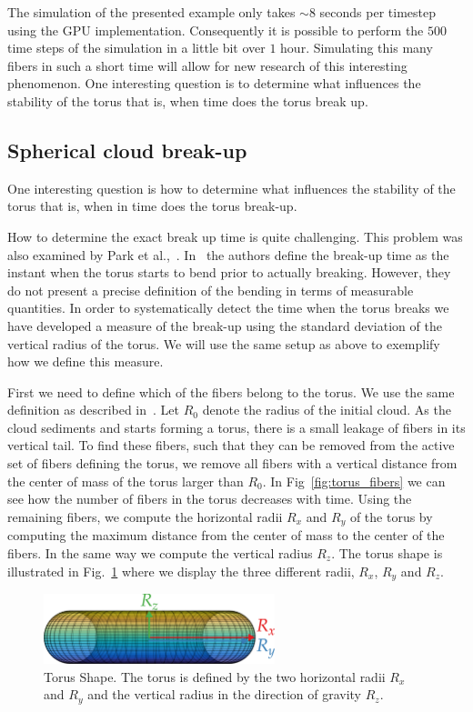 The simulation of the presented example only takes ${\sim}8$ seconds per timestep using the GPU implementation. Consequently it is possible to perform the $500$ time steps of the simulation in a little bit over $1$ hour. Simulating this many fibers in such a short time will allow for new research of this interesting phenomenon. One interesting question is to determine what influences the stability of the torus that is, when time does the torus break up.

\subsection{Spherical cloud break-up}
\label{subsec:sphere_break}

One interesting question is how to determine what influences the stability of the torus that is, when in time does the torus break-up.

How to determine the exact break up time is quite challenging. This problem was also examined by Park et al.,~\cite{Park2010}. In~\cite{Park2010} the authors define the break-up time as the instant when the torus starts to bend prior to actually breaking. However, they do not present a precise definition of the bending in terms of measurable quantities. In order to systematically detect the time when the torus breaks we have developed a measure of the break-up using the standard deviation of the vertical radius of the torus.  We will use the same setup as above to exemplify how we define this measure.

First we need to define which of the fibers belong to the torus. We use the same definition as described in~\cite{Park2010}. Let $R_0$ denote the radius of the initial cloud. As the cloud sediments and starts forming a torus, there is a small leakage of fibers in its vertical tail. To find these fibers, such that they can be removed from the active set of fibers defining the torus, we remove all fibers with a vertical distance from the center of mass of the torus larger than $R_0$. In Fig~\ref{fig:torus_fibers} we can see how the number of fibers in the torus decreases with time. Using the remaining fibers, we compute the horizontal radii $R_x$ and $R_y$ of the torus by computing the maximum distance from the center of mass to the center of the fibers. In the same way we compute the vertical radius $R_z$. The torus shape is illustrated in Fig.~\ref{fig:torus_shape} where we display the three different radii, $R_x$, $R_y$ and $R_z$.

\begin{figure}[htbp]
  \centering
  \includegraphics[width=0.6\textwidth]{img/torus3.png}
  \caption[Torus Shape.]{Torus Shape. The torus is defined by the two horizontal radii $R_x$ and $R_y$ and the vertical radius in the direction of gravity $R_z$.}
  \label{fig:torus_shape}
\end{figure}

